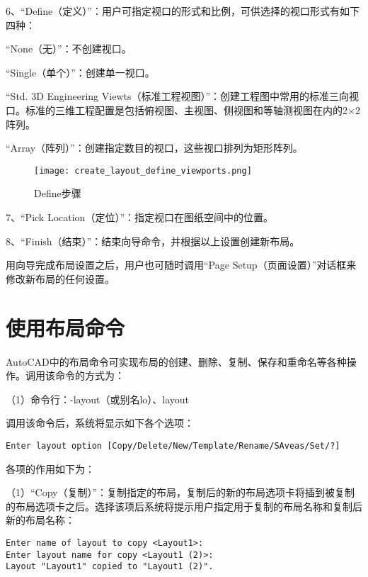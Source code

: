 6、“Define（定义）”：用户可指定视口的形式和比例，可供选择的视口形式有如下四种：

\begin{compactitem}
\item “None（无）”：不创建视口。
\item “Single（单个）”：创建单一视口。
\item “Std. 3D Engineering Viewts（标准工程视图）”：创建工程图中常用的标准三向视口。标准的三维工程配置是包括俯视图、主视图、侧视图和等轴测视图在内的2$\times$2阵列。
\item “Array（阵列）”：创建指定数目的视口，这些视口排列为矩形阵列。
\end{compactitem}

\begin{figure}[htbp]
\centering
\texttt{[image: create\_layout\_define\_viewports.png]}
\caption{Define步骤}
\end{figure}

7、“Pick Location（定位）”：指定视口在图纸空间中的位置。

8、“Finish（结束）”：结束向导命令，并根据以上设置创建新布局。

用向导完成布局设置之后，用户也可随时调用“Page Setup（页面设置）”对话框来修改新布局的任何设置。


\section{使用布局命令}

AutoCAD中的布局命令可实现布局的创建、删除、复制、保存和重命名等各种操作。调用该命令的方式为：

（1）命令行：-layout（或别名lo）、layout

调用该命令后，系统将显示如下各个选项：

\begin{verbatim}
Enter layout option [Copy/Delete/New/Template/Rename/SAveas/Set/?]
\end{verbatim}

各项的作用如下为：

（1）“Copy（复制）”：复制指定的布局，复制后的新的布局选项卡将插到被复制的布局选项卡之后。选择该项后系统将提示用户指定用于复制的布局名称和复制后新的布局名称：

\begin{verbatim}
Enter name of layout to copy <Layout1>:
Enter layout name for copy <Layout1 (2)>:
Layout "Layout1" copied to "Layout1 (2)".	
\end{verbatim}

